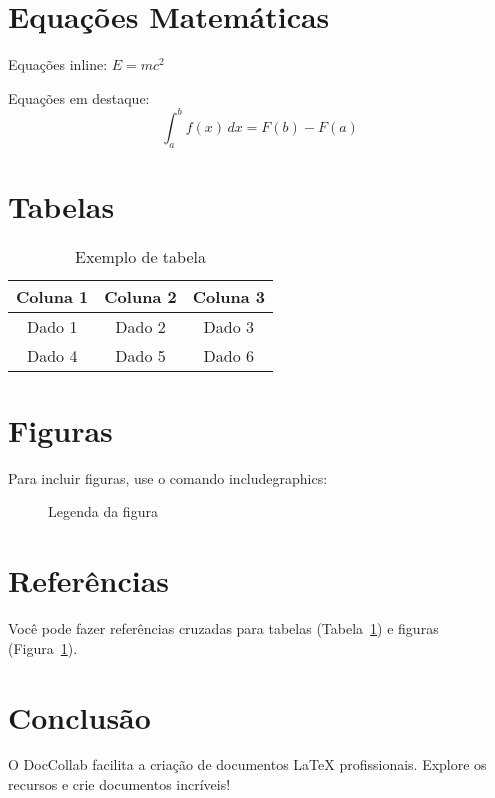 \documentclass[12pt,a4paper]{article}
\begin{document}
\section{Equações Matemáticas}

Equações inline: $E = mc^2$

Equações em destaque:
\begin{equation}
    \int_{a}^{b} f(x) \, dx = F(b) - F(a)
\end{equation}

\section{Tabelas}

\begin{table}[h]
\centering
\begin{tabular}{|c|c|c|}
\hline
\textbf{Coluna 1} & \textbf{Coluna 2} & \textbf{Coluna 3} \\
\hline
Dado 1 & Dado 2 & Dado 3 \\
Dado 4 & Dado 5 & Dado 6 \\
\hline
\end{tabular}
\caption{Exemplo de tabela}
\label{tab:exemplo}
\end{table}

\section{Figuras}

Para incluir figuras, use o comando includegraphics:

\begin{figure}[h]
\centering
\caption{Legenda da figura}
\label{fig:exemplo}
\end{figure}

\section{Referências}

Você pode fazer referências cruzadas para tabelas (Tabela~\ref{tab:exemplo}) 
e figuras (Figura~\ref{fig:exemplo}).

\section{Conclusão}

O DocCollab facilita a criação de documentos LaTeX profissionais. 
Explore os recursos e crie documentos incríveis!
\end{document}
